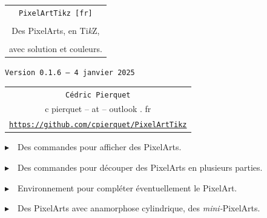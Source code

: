 \documentclass{article}
\def\TPversion{0.1.6}
\def\TPdate{4 janvier 2025}
\begin{document}
\pagestyle{fancy}

\thispagestyle{empty}

\vspace{2cm}

\begin{center}
	\begin{minipage}{0.75\linewidth}
	\begin{tcolorbox}[colframe=yellow,colback=yellow!15]
		\begin{center}
			\begin{tabular}{c}
				{\Huge \texttt{PixelArtTikz [fr]}}\\
				\\
				{\LARGE Des PixelArts, en Ti\textit{k}Z}, \\
				\\
				{\LARGE avec solution et couleurs.} \\
			\end{tabular}
			
			\medskip
			
			{\small \texttt{Version \TPversion{} -- \TPdate}}
		\end{center}
	\end{tcolorbox}
\end{minipage}
\end{center}

\vspace{0.5cm}

\begin{center}
	\begin{tabular}{c}
	\texttt{Cédric Pierquet}\\
	{\ttfamily c pierquet -- at -- outlook . fr}\\
	\texttt{\url{https://github.com/cpierquet/PixelArtTikz}}
\end{tabular}
\end{center}

\vspace{0.25cm}

{$\blacktriangleright$~~Des commandes pour afficher des PixelArts.}

\smallskip

{$\blacktriangleright$~~Des commandes pour découper des PixelArts en plusieurs parties.}

\smallskip

{$\blacktriangleright$~~Environnement pour compléter éventuellement le PixelArt.}

\smallskip

{$\blacktriangleright$~~Des PixelArts avec anamorphose cylindrique, des \textit{mini-}PixelArts.}
\end{document}

